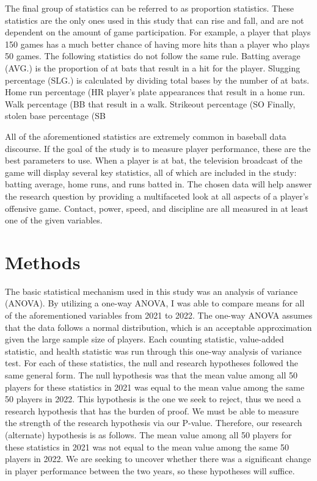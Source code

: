 \documentclass[10pt]{article}
\begin{document}
The final group of statistics can be referred to as proportion statistics. These statistics are the only ones used in this 
study that can rise and fall, and are not dependent on the amount of game participation. For example, a player that plays 150 
games has a much better chance of having more hits than a player who plays 50 games. The following statistics do not follow 
the same rule. Batting average (AVG.) is the proportion of at bats that result in a hit for the player. Slugging percentage 
(SLG.) is calculated by dividing total bases by the number of at bats. Home run percentage (HR%
player’s plate appearances that result in a home run. Walk percentage (BB%
that result in a walk. Strikeout percentage (SO%
Finally, stolen base percentage (SB%

All of the aforementioned statistics are extremely common in baseball data discourse. If the goal of the study is to measure 
player performance, these are the best parameters to use. When a player is at bat, the television broadcast of the game will 
display several key statistics, all of which are included in the study: batting average, home runs, and runs batted in. The 
chosen data will help answer the research question by providing a multifaceted look at all aspects of a player’s offensive 
game. Contact, power, speed, and discipline are all measured in at least one of the given variables.

\section{Methods}

The basic statistical mechanism used in this study was an analysis of variance (ANOVA). By utilizing a one-way ANOVA, I was able to 
compare means for all of the aforementioned variables from 2021 to 2022. The one-way ANOVA assumes that the data follows a 
normal distribution, which is an acceptable approximation given the large sample size of players. Each counting statistic, 
value-added statistic, and health statistic was run through this one-way analysis of variance test. For each of these 
statistics, the null and research hypotheses followed the same general form. The null hypothesis was that the mean value 
among all 50 players for these statistics in 2021 was equal to the mean value among the same 50 players in 2022. This 
hypothesis is the one we seek to reject, thus we need a research hypothesis that has the burden of proof. We must be able 
to measure the strength of the research hypothesis via our P-value. Therefore, our research (alternate) hypothesis is as 
follows. The mean value among all 50 players for these statistics in 2021 was not equal to the mean value among the same 50 
players in 2022. We are seeking to uncover whether there was a significant change in player performance between the two years, 
so these hypotheses will suffice. 
\end{document}
